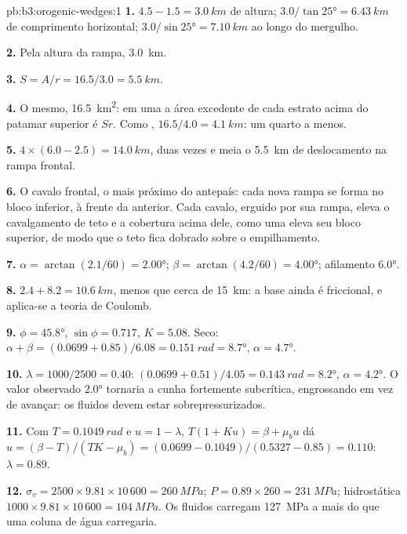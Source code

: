 \begin{solution}{pb:b3:orogenic-wedges:1}
\textbf{1.} $4.5 - 1.5 = \qty{3.0}{km}$ de altura; $3.0/\tan\ang{25} =
\qty{6.43}{km}$ de comprimento horizontal; $3.0/\sin\ang{25} = \qty{7.10}{km}$ ao longo
do mergulho.

\textbf{2.} Pela altura da rampa, \qty{3.0}{km}.

\textbf{3.} $S = A/r = 16.5/3.0 = \qty{5.5}{km}$.

\textbf{4.} O mesmo, \qty{16.5}{km^2}: em uma  a área excedente
de cada estrato acima do patamar superior é $Sr$. Como , $16.5/4.0 =
\qty{4.1}{km}$: um quarto a menos.

\textbf{5.} $4\times(6.0 - 2.5) = \qty{14.0}{km}$, duas vezes e meia
o \qty{5.5}{km} de deslocamento na rampa frontal.

\textbf{6.} O cavalo frontal, o mais próximo do antepaís: cada nova rampa
se forma no bloco inferior, à frente da anterior. Cada cavalo, erguido por sua rampa,
eleva o cavalgamento de teto e a cobertura acima dele, como uma  eleva seu
bloco superior, de modo que o teto fica dobrado sobre o empilhamento.

\textbf{7.} $\alpha = \arctan(2.1/60) = \ang{2.00}$; $\beta =
\arctan(4.2/60) = \ang{4.00}$; afilamento \ang{6.0}.

\textbf{8.} $2.4 + 8.2 = \qty{10.6}{km}$, menos que cerca de \qty{15}{km}: a
base ainda é friccional, e aplica-se a teoria de Coulomb.

\textbf{9.} $\phi = \ang{45.8}$, $\sin\phi = 0.717$, $K = 5.08$. Seco:
$\alpha + \beta = (0.0699 + 0.85)/6.08 = \qty{0.151}{rad} = \ang{8.7}$,
$\alpha = \ang{4.7}$.

\textbf{10.} $\lambda = 1000/2500 = 0.40$: $(0.0699 + 0.51)/4.05 =
\qty{0.143}{rad} = \ang{8.2}$, $\alpha = \ang{4.2}$. O valor observado \ang{2.0}
tornaria a cunha fortemente subcrítica, engrossando em vez de avançar:
os fluidos devem estar sobrepressurizados.

\textbf{11.} Com $T = \qty{0.1049}{rad}$ e $u = 1 - \lambda$, $T(1 + Ku) =
\beta + \mu_bu$ dá $u = (\beta - T)/(TK - \mu_b) = (0.0699 -
0.1049)/(0.5327 - 0.85) = 0.110$: $\lambda = 0.89$.

\textbf{12.} $\sigma_v = 2500\times9.81\times10\,600 = \qty{260}{MPa}$; $P =
0.89\times260 = \qty{231}{MPa}$; hidrostática $1000\times9.81\times10\,600 =
\qty{104}{MPa}$. Os fluidos carregam \qty{127}{MPa} a mais do que uma
coluna de água carregaria.


\end{solution}
